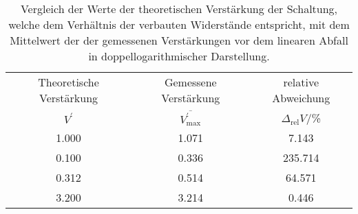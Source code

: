 \begin{table}[!h]
	\centering
	\begin{tabular}{ccc}
		\toprule
		Theoretische Verstärkung & Gemessene Verstärkung & relative Abweichung\\
		$V^{\prime}$ & $\overline{V^{\prime}_{\mathrm{max}}}$ & $\Delta_{\mathrm{rel}} 
		V$/\si{\percent}\\
\midrule
		\num{1.000} & \num{1.071} & \num{7.143}\\
		\num{0.100} & \num{0.336} & \num{235.714}\\
		\num{0.312} & \num{0.514} & \num{64.571}\\
		\num{3.200} & \num{3.214} & \num{0.446}\\
		\bottomrule
	\end{tabular}
	\caption{ Vergleich der Werte der theoretischen Verstärkung der Schaltung, welche dem Verhältnis der verbauten 
Widerstände entspricht, mit dem Mittelwert der der gemessenen Verstärkungen vor dem linearen Abfall in doppellogarithmischer Darstellung. \label{tab:gegengekoppelter_verstaerker_max_verstaerkung}}
\end{table}
